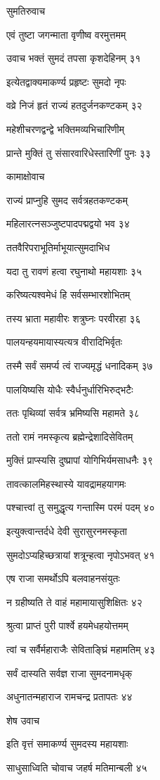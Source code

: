 सुमतिरुवाच

एवं तुष्टा जगन्माता वृणीष्व वरमुत्तमम्

उवाच भक्तं सुमदं तपसा कृशदेहिनम् ३१

इत्येतद्वाक्यमाकर्ण्य प्रहृष्टः सुमदो नृपः

वव्रे निजं हृतं राज्यं हतदुर्जनकण्टकम् ३२

महेशीचरणद्वन्द्वे भक्तिमव्यभिचारिणीम्

प्रान्ते मुक्तिं तु संसारवारिधेस्तारिणीं पुनः ३३

कामाक्षोवाच

राज्यं प्राप्नुहि सुमद सर्वत्रहतकण्टकम्

महिलारत्नसञ्जुष्टपादपद्मद्वयो भव ३४

ततवैरिपराभूतिर्माभूयात्सुमदाभिध

यदा तु रावणं हत्वा रघुनाथो महायशाः ३५

करिष्यत्यश्वमेधं हि सर्वसम्भारशोभितम्

तस्य भ्राता महावीरः शत्रुघ्नः परवीरहा ३६

पालयन्हयमायास्यत्यत्र वीरादिभिर्वृतः

तस्मै सर्वं समर्प्य त्वं राज्यमृद्धं धनादिकम् ३७

पालयिष्यसि योधैः स्वैर्धनुर्धारिभिरुद्भटैः

ततः पृथिव्यां सर्वत्र भ्रमिष्यसि महामते ३८

ततो रामं नमस्कृत्य ब्रह्मेन्द्रेशादिसेवितम्

मुक्तिं प्राप्स्यसि दुष्प्रापां योगिभिर्यमसाधनैः ३९

तावत्कालमिहस्थास्ये यावद्रामहयागमः

पश्चात्त्वां तु समुद्धृत्य गन्तास्मि परमं पदम् ४०

इत्युक्त्वान्तर्दधे देवी सुरासुरनमस्कृता

सुमदोऽप्यहिच्छत्रायां शत्रून्हत्वा नृपोऽभवत् ४१

एष राजा समर्थोऽपि बलवाहनसंयुतः

न ग्रहीष्यति ते वाहं महामायासुशिक्षितः ४२

श्रुत्वा प्राप्तं पुरी पार्श्वे हयमेधहयोत्तमम्

त्वां च सर्वैर्महाराजैः सेविताङ्घ्रिं महामतिम् ४३

सर्वं दास्यति सर्वज्ञ राजा सुमदनामधृक्

अधुनातन्महाराज रामचन्द्र प्रतापतः ४४

शेष उवाच

इति वृत्तं समाकर्ण्य सुमदस्य महायशाः

साधुसाध्विति चोवाच जहर्ष मतिमान्बली ४५

